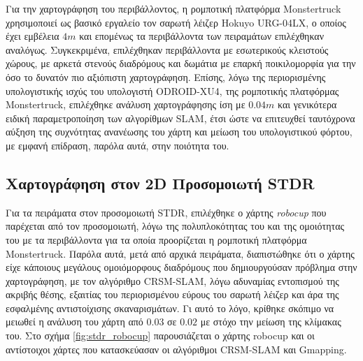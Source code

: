 \bigskip
Για την χαρτογράφηση του περιβάλλοντος, η ρομποτική πλατφόρμα Monstertruck χρησιμοποιεί ως βασικό εργαλείο τον σαρωτή λέιζερ Hokuyo URG-04LX, ο οποίος έχει εμβέλεια $4m$ και επομένως τα περιβάλλοντα των πειραμάτων επιλέχθηκαν αναλόγως. Συγκεκριμένα, επιλέχθηκαν περιβάλλοντα με εσωτερικούς κλειστούς χώρους, με αρκετά στενούς διαδρόμους και δωμάτια με επαρκή ποικιλομορφία για την όσο το δυνατόν πιο αξιόπιστη χαρτογράφηση. Επίσης, λόγω της περιορισμένης υπολογιστικής ισχύς του υπολογιστή ODROID-XU4, της ρομποτικής πλατφόρμας Monstertruck, επιλέχθηκε ανάλυση χαρτογράφησης ίση με $0.04m$ και γενικότερα ειδική παραμετροποίηση των αλγορίθμων SLAM, έτσι ώστε να επιτευχθεί ταυτόχρονα αύξηση της συχνότητας ανανέωσης του χάρτη και μείωση του υπολογιστικού φόρτου, με εμφανή επίδραση, παρόλα αυτά, στην ποιότητα του.

\subsection{Χαρτογράφηση στον 2D Προσομοιωτή STDR} \label{ssec:stdr_slam}
Για τα πειράματα στον προσομοιωτή STDR, επιλέχθηκε ο χάρτης \textit{robocup} που παρέχεται από τον προσομοιωτή, λόγω της πολυπλοκότητας του και της ομοιότητας του με τα περιβάλλοντα για τα οποία προορίζεται η ρομποτική πλατφόρμα Monstertruck. Παρόλα αυτά, μετά από αρχικά πειράματα, διαπιστώθηκε ότι ο χάρτης είχε κάποιους μεγάλους ομοιόμορφους διαδρόμους που δημιουργούσαν πρόβλημα στην χαρτογράφηση, με τον αλγόριθμο CRSM-SLAM, λόγω αδυναμίας εντοπισμού της ακριβής θέσης, εξαιτίας του περιορισμένου εύρους του σαρωτή λέιζερ και άρα της εσφαλμένης αντιστοίχισης σκαναρισμάτων. Γι αυτό το λόγο, κρίθηκε σκόπιμο να μειωθεί η ανάλυση του χάρτη από $0.03$ σε $0.02$ με στόχο την μείωση της κλίμακας του. Στο σχήμα \ref{fig:stdr_robocup} παρουσιάζεται ο χάρτης robocup και οι αντίστοιχοι χάρτες που κατασκεύασαν οι αλγόριθμοι CRSM-SLAM και Gmapping.

